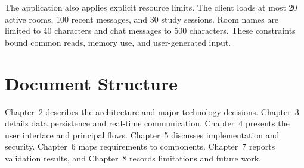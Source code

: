The application also applies explicit resource limits. The client loads at most 20 active rooms, 100 recent messages, and 30 study sessions. Room names are limited to 40 characters and chat messages to 500 characters. These constraints bound common reads, memory use, and user-generated input.

\section{Document Structure}
Chapter~2 describes the architecture and major technology decisions. Chapter~3 details data persistence and real-time communication. Chapter~4 presents the user interface and principal flows. Chapter~5 discusses implementation and security. Chapter~6 maps requirements to components. Chapter~7 reports validation results, and Chapter~8 records limitations and future work.
